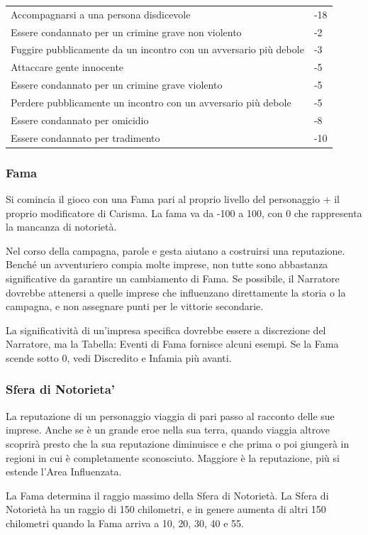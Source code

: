 \documentclass[a4paper,twoside,openany]{book}
\begin{document}
\begin{multicols}{2}
\begin{tabularx}{0.48\textwidth}{Xl}
Accompagnarsi a una persona disdicevole&-18\\
Essere condannato per un crimine grave non violento&-2\\
Fuggire pubblicamente da un incontro con un avversario più debole&-3\\
Attaccare gente innocente&-5\\
Essere condannato per un crimine grave violento&-5\\
Perdere pubblicamente un incontro con un avversario più debole&-5\\
Essere condannato per omicidio&-8\\
Essere condannato per tradimento&-10\\
\end{tabularx}


\subsubsection{Fama}

Si comincia il gioco con una Fama pari al proprio livello del personaggio + il proprio modificatore di Carisma. La fama va da -100 a 100, con 0 che rappresenta la mancanza di notorietà.

Nel corso della campagna, parole e gesta aiutano a costruirsi una reputazione. Benché un avventuriero compia molte imprese, non tutte sono abbastanza significative da garantire un cambiamento di Fama. Se possibile, il Narratore dovrebbe attenersi a quelle imprese che influenzano direttamente la storia o la campagna, e non assegnare punti per le vittorie secondarie.

La significatività di un'impresa specifica dovrebbe essere a discrezione del Narratore, ma la Tabella: Eventi di Fama fornisce alcuni esempi. Se la Fama scende sotto 0, vedi Discredito e Infamia più avanti.

\subsubsection{Sfera di Notorieta'}

La reputazione di un personaggio viaggia di pari passo al racconto delle sue imprese. Anche se è un grande eroe nella sua terra, quando viaggia altrove scoprirà presto che la sua reputazione diminuisce e che prima o poi giungerà in regioni in cui è completamente sconosciuto. Maggiore è la reputazione, più si estende l'Area Influenzata.

La Fama determina il raggio massimo della Sfera di Notorietà. La Sfera di Notorietà ha un raggio di 150 chilometri, e in genere aumenta di altri 150 chilometri quando la Fama arriva a 10, 20, 30, 40 e 55.


\end{multicols}
\end{document}
